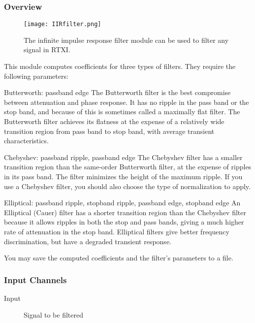 
\subsubsection{Overview}
\label{IIR Filter}

\begin{figure}[h]
\begin{center}
\texttt{[image: IIRfilter.png]}
\caption[iirfilter]{The infinite impulse response filter module can be used to filter  any signal in RTXI.}
\end{center}
\label{firfilter}
\end{figure}

This module computes coefficients for three types of filters. They require the following parameters:

Butterworth: passband edge
The Butterworth filter is the best compromise between attenuation and phase response. It has no ripple in the pass band or the stop band, and because of this is sometimes called a maximally flat filter. The Butterworth filter achieves its flatness at the expense of a relatively wide transition region from pass band to stop band, with average transient characteristics.

Chebyshev: passband ripple, passband edge
The Chebyshev filter has a smaller transition region than the same-order Butterworth filter, at the expense of ripples in its pass band. The filter minimizes the height of the maximum ripple. If you use a Chebyshev filter, you should also choose the type of normalization to apply.

Elliptical: passband ripple, stopband ripple, passband edge, stopband edge
An Elliptical (Cauer) filter has a shorter transition region than the Chebyshev filter because it allows ripples in both the stop and pass bands, giving a much higher rate of attenuation in the stop band. Elliptical filters give better frequency discrimination, but have a degraded transient response.

You may save the computed coefficients and the filter’s parameters to a file.

\subsubsection{Input Channels}
\begin{description}
\item [Input]Signal to be filtered
\end{description}

